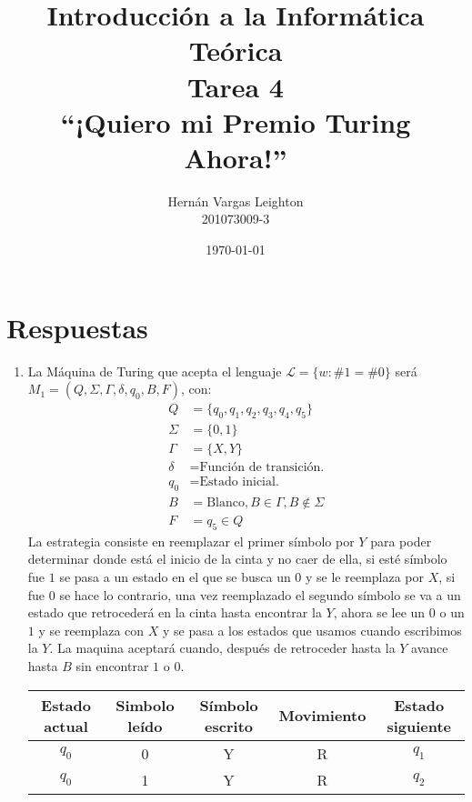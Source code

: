 \documentclass[spanish, fleqn]{article}
\title{Introducción a la Informática Teórica \\
       Tarea 4\\
       ``¡Quiero mi Premio Turing Ahora!''
      }
\author{Hernán Vargas Leighton \\ 201073009-3}
\date{\today}
\begin{document}
\maketitle
\thispagestyle{empty}

\section*{Respuestas}

\begin{enumerate}
	\item
		La Máquina de Turing que acepta el lenguaje $\mathcal{L} = \{w: 
		\#1 = \#0\}$ será $ M_1 = (Q, \Sigma, \Gamma, \delta, q_0, B, F) $, con:
		\begin{align*}
			Q &= \{q_0,q_1,q_2,q_3,q_4,q_5\} \\
			\Sigma &= \{0, 1 \} \\
			\Gamma &= \{X, Y \} \\
			\delta &= \text{Función de transición.} \\
			q_0 &= \text{Estado inicial.} \\
			B &= \text{Blanco}, B \in \Gamma, B \notin \Sigma \\
			F &= q_5 \in Q
		\end{align*}
		La estrategia consiste en reemplazar el primer símbolo por $Y$ para
		poder determinar donde está el inicio de la cinta y no caer de ella, 
		si esté símbolo fue $1$ se pasa a un estado en el que se busca un $0$
		y se le reemplaza por $X$, si fue $0$ se hace lo contrario, una vez
		reemplazado el segundo símbolo se va a un estado que retrocederá en la
		cinta hasta encontrar la $Y$, ahora se lee un $0$ o un $1$ y se
		reemplaza con $X$ y se pasa a los estados que usamos cuando escribimos
		la $Y$. La maquina aceptará cuando, después de retroceder hasta la $Y$
		avance hasta $B$ sin encontrar $1$ o $0$.
		\begin{table}[h]
			\centering
			\begin{tabular}{|c|c|c|c|c|}
				\hline
					Estado actual & Simbolo leído & Símbolo escrito & 
					Movimiento & Estado siguiente \\
				\hline
				\hline
				$q_0$ & 0 & Y & R & $q_1$ \\
				$q_0$ & 1 & Y & R & $q_2$ \\

\end{tabular}
\end{table}
\end{enumerate}
\end{document}
